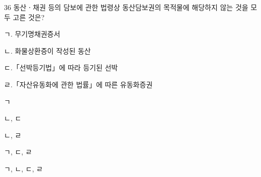 \begin{question}{36}
동산ㆍ채권 등의 담보에 관한 법령상 동산담보권의 목적물에 해당하지 않는 것을 모두 고른 것은?
\begin{framedtext}
ㄱ. 무기명채권증서 \par
ㄴ. 화물상환증이 작성된 동산 \par
ㄷ.「선박등기법」에 따라 등기된 선박 \par
ㄹ.「자산유동화에 관한 법률」에 따른 유동화증권 \par
\end{framedtext}
\begin{choices}
  \item ㄱ
  \item ㄴ, ㄷ
  \item ㄴ, ㄹ
  \item ㄱ, ㄷ, ㄹ
  \item ㄱ, ㄴ, ㄷ, ㄹ
\end{choices}
\end{question}

